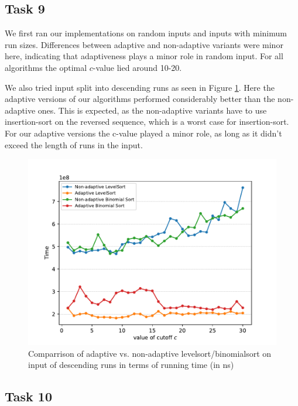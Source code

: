 \documentclass[11pt, a4paper]{article}
\begin{document}
\subsection{Task 9}

We first ran our implementations on random inputs and inputs with minimum run sizes. Differences between adaptive and non-adaptive variants were minor here, indicating that adaptiveness plays a minor role in random input. For all algorithms the optimal $c$-value lied around 10-20.

We also tried input split into descending runs as seen in Figure \ref{fig:descRuns}. Here the adaptive versions of our algorithms performed considerably better than the non-adaptive ones. This is expected, as the non-adaptive variants have to use insertion-sort on the reversed sequence, which is a worst case for insertion-sort. For our adaptive versions the c-value played a minor role, as long as it didn't exceed the length of runs in the input.

\begin{figure}[h]
  \begin{center}
    \includegraphics[width=\textwidth]{plot/t9more_runs_time_plot.pdf}
    \caption{Comparrison of adaptive vs. non-adaptive levelsort/binomialsort on input of descending runs in terms of running time (in ns) }
    \label{fig:descRuns}
  \end{center}
\end{figure}


\subsection{Task 10}
\end{document}
